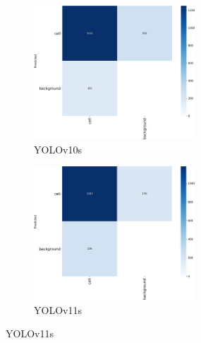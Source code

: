 \documentclass[12pt,a4paper,onecolumn,oneside]{report}
\begin{document}
\begin{figure}[H]
  \vspace{0.1cm}
  \begin{subfigure}[b]{0.45\textwidth}
    \centering
    \includegraphics[height=5cm]{figuras/resultados experimentacion/yolov10s/test/confusion_matrix.png}
    \vspace{-0.3cm}
    \caption{\footnotesize YOLOv10s}
    \label{fig:confusion_yolov10s_test}
  \end{subfigure}
  \hfill
  \begin{subfigure}[b]{0.45\textwidth}
    \centering
    \includegraphics[height=5cm]{figuras/resultados experimentacion/yolov11s/test/confusion_matrix.png}
    \vspace{-0.3cm}
    \caption{\footnotesize YOLOv11s}
    \label{fig:confusion_yolov11s_test}
  \end{subfigure}
  

\end{figure}
\end{document}
